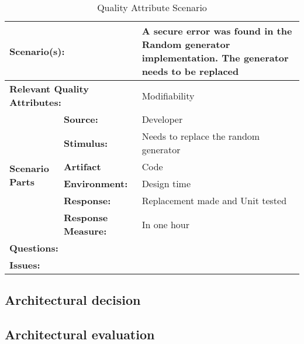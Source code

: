 \begin{table}[H]
\begin{center}
\begin{tabular}{|p{0.3cm}|p{2.5cm}|p{8cm}|}
  \hline
  \multicolumn{2}{|p{3cm}|}{\bfseries Scenario(s):} & A secure error was found in the Random generator implementation. The generator needs to be replaced \\
  \hline
  \multicolumn{2}{|p{3cm}|}{\bfseries Relevant Quality Attributes:} & Modifiability\\
  \hline
  \multirow{6}{*}{\begin{sideways}{\bfseries Scenario Parts}\end{sideways}}
  & {\bfseries Source:} & Developer \\
  \cline{2-3}
  & {\bfseries Stimulus:} & Needs to replace the random generator \\
  \cline{2-3}
  & {\bfseries Artifact} &  Code \\
  \cline{2-3}
  & {\bfseries Environment:} &  Design time \\
  \cline{2-3}
  & {\bfseries Response:} &  Replacement made and Unit tested\\
  \cline{2-3}
  & {\bfseries Response Measure:} & In one hour\\
  \hline
  \multicolumn{2}{|p{3cm}|}{\bfseries Questions:} &  \\
  \hline
  \multicolumn{2}{|p{3cm}|}{\bfseries Issues:} &  \\
  \hline
\end{tabular}
\caption{Quality Attribute Scenario}
\end{center}
\end{table}


\subsection{Architectural decision}


\subsection{Architectural evaluation}